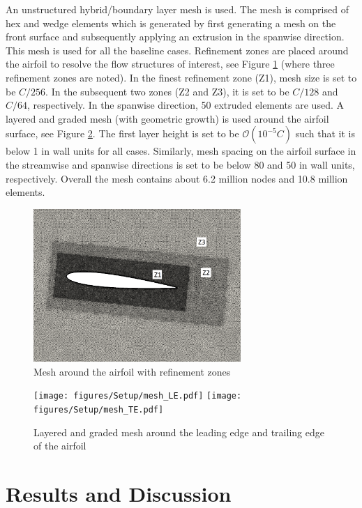 An unstructured hybrid/boundary layer mesh is used.
The mesh is comprised of hex and wedge elements which is generated by first generating a mesh on the front surface and subsequently applying an extrusion in the spanwise direction. This mesh is used for all the baseline cases.
Refinement zones are placed around the airfoil to resolve the flow structures of interest, see Figure \ref{fig:mesh} (where three refinement zones are noted).
In the finest refinement zone (Z1), mesh size is set to be $C/256$.
In the subsequent two zones (Z2 and Z3), it is set to be $C/128$ and $C/64$, respectively.
In the spanwise direction, 50 extruded elements are used.
A layered and graded mesh (with geometric growth) is used around the airfoil surface, see Figure \ref{fig:mesh2}.
The first layer height is set to be $\mathcal{O}(10^{-5} C)$ such that it is below 1 in wall units for all cases.
Similarly, mesh spacing on the airfoil surface in the streamwise and spanwise directions is set to be below 80 and 50 in wall units, respectively.
Overall the mesh contains about 6.2 million nodes and 10.8 million elements.

\begin{figure}[H]
\centering
\includegraphics[width=0.7\textwidth]{figures/Setup/mesh_screenshot.pdf}
\caption{Mesh around the airfoil with refinement zones}
\label{fig:mesh}
\end{figure}

\begin{figure}[H]
\centering
\texttt{[image: figures/Setup/mesh\_LE.pdf]}
\texttt{[image: figures/Setup/mesh\_TE.pdf]}
\caption{Layered and graded mesh around the leading edge and trailing edge of the airfoil}
\label{fig:mesh2}
\end{figure}

\section{Results and Discussion}

